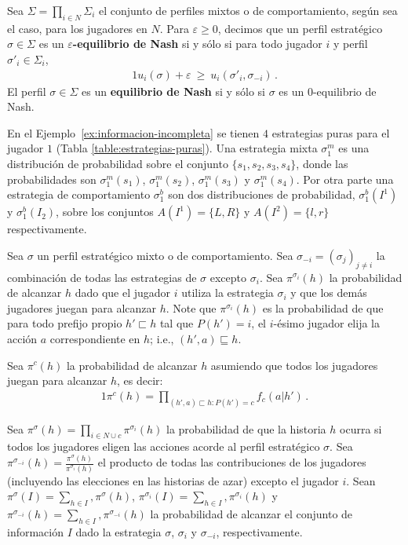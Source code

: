 \begin{definition}
Sea $\Sigma=\prod_{i\in N}\Sigma_i$ el conjunto de perfiles mixtos o de comportamiento, según sea el caso, para los jugadores en $N$.
Para $\varepsilon\geq 0$, decimos que un perfil estratégico $\sigma \in \Sigma$ es un \textbf{$\varepsilon$-equilibrio de Nash} si y sólo si para todo jugador $i$ y perfil $\sigma'_i\in\Sigma_i$,
\begin{alignat}{1}
u_i(\sigma) + \varepsilon\ \geq\ u_i(\sigma'_i, \sigma_{-i}) \,.
\end{alignat}
El perfil $\sigma\in\Sigma$ es un \textbf{equilibrio de Nash} si y sólo si $\sigma$ es un $0$-equilibrio de Nash.
\end{definition}

En el Ejemplo~\ref{ex:informacion-incompleta} se tienen $4$ estrategias puras para el jugador $1$ (Tabla \ref{table:estrategias-puras}). Una estrategia mixta $\sigma^m_1$ es una distribución de probabilidad sobre el conjunto $\{s_1, s_2, s_3, s_4\}$, donde las probabilidades son $\sigma^m_1(s_1)$, $\sigma^m_1(s_2)$, $\sigma^m_1(s_3)$ y $\sigma^m_1(s_4)$. Por otra parte una estrategia de comportamiento $\sigma^b_1$ son dos distribuciones de probabilidad, $\sigma^b_1(I^1)$ y $\sigma^b_1(I_2)$, sobre los conjuntos $A(I^1) = \{L, R\}$ y $A(I^2) = \{l, r\}$ respectivamente.

Sea $\sigma$ un perfil estratégico mixto o de comportamiento. Sea  $\sigma_{-i} = (\sigma_j)_{j \neq i}$ la combinación de todas las estrategias de $\sigma$ excepto $\sigma_i$. Sea $\pi^{\sigma_i}(h)$ la probabilidad de alcanzar $h$ dado que el jugador $i$ utiliza la estrategia $\sigma_i$ y que los demás jugadores juegan para alcanzar $h$. Note que $\pi^{\sigma_i}(h)$ es la probabilidad de que para todo prefijo propio $h' \sqsubset h$ tal que $P(h') = i$, el $i$-ésimo jugador elija la acción $a$ correspondiente en $h$; i.e., $(h', a) \sqsubseteq h$.

Sea $\pi^c(h)$ la probabilidad de alcanzar $h$ asumiendo que todos los jugadores juegan para alcanzar $h$, es decir:
\begin{alignat}{1}
\pi^c(h) = \prod_{(h', a) \sqsubset h : P(h') = c} f_c(a | h') \, .
\end{alignat}

Sea $\pi^{\sigma}(h) = \prod_{i \in N \cup {c}} \pi^{\sigma_i}(h)$ la probabilidad de que la historia $h$ ocurra si todos los jugadores eligen las acciones acorde al perfil estratégico  $\sigma$.  Sea $\pi^{\sigma_{-i}}(h) = \frac{\pi^{\sigma}(h)}{\pi^{\sigma_{i}}(h)}$ el producto de todas las contribuciones de los jugadores (incluyendo las elecciones en las historias de azar) excepto el jugador $i$. Sean $\pi^{\sigma}(I) = \sum_{h \in I},  \pi^\sigma(h)$, $\pi^{\sigma_i}(I) = \sum_{h \in I},  \pi^{\sigma_i}(h)$ y $\pi^{\sigma_{-i}}(h) = \sum_{h \in I},  \pi^{\sigma_{-i}}(h)$ la probabilidad de alcanzar el conjunto de información $I$ dado la estrategia $\sigma$, $\sigma_{i}$ y $\sigma_{-i}$, respectivamente.


